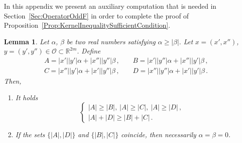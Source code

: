 \documentclass[12pt,reqno]{amsart}
\newtheorem{lemma}[theorem]{Lemma}
\theoremstyle{definition}
\theoremstyle{remark}
\newcommand{\con}[1]{\mathbb{#1}}
\newcommand{\R}{\con{R}} %
\newcommand{\ocal}{\mathcal{O}}
\numberwithin{equation}{section}
\begin{document}
	In this appendix we present an auxiliary computation that is needed in Section~\ref{Sec:OperatorOddF} in order to complete the proof of Proposition~\ref{Prop:KernelInequalitySufficientCondition}.
	
	\begin{lemma}
		\label{Lemma:ComputationABCD} Let $\alpha$, $\beta$ be two real numbers satisfying $\alpha \geq
		|\beta|$. Let $x=(x',x'')$, $y=(y',y'')\in \ocal \subset \R^{2m}$. Define
		$$
		\begin{array}{cc}
		A = |x'||y'|  \alpha + |x''||y''|\beta \,, \ \ \ \ \ &
		B = |x'||y''| \alpha + |x''||y'| \beta \,, \\
		C = |x''||y'| \alpha + |x'||y''| \beta \,, \ \ \ \ \ &
		D = |x''||y''|\alpha + |x'||y'|  \beta \,.
		\end{array}
		$$
		Then,
		\begin{enumerate}
			\item It holds
			$$
			\begin{cases}
			|A| \geq |B|,\ |A| \geq|C|, \ |A| \geq|D|\,, \\
			|A| + |D| \geq |B| + |C|\,.
			\end{cases}
			$$
			\item If  the sets $\{|A|,|D|\}$ and $\{|B|,|C|\}$ coincide, then necessarily $\alpha = \beta = 0$.
		\end{enumerate}
		
	\end{lemma}
\end{document}
